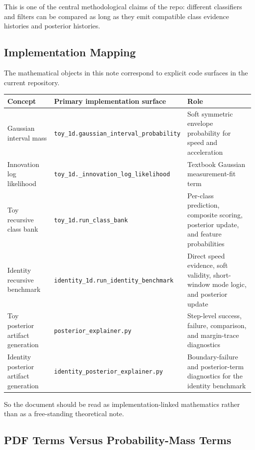\documentclass[11pt]{article}
\begin{document}
This is one of the central methodological claims of the repo: different
classifiers and filters can be compared as long as they emit compatible class
evidence histories and posterior histories.

\subsection{Implementation Mapping}

The mathematical objects in this note correspond to explicit code surfaces in
the current repository.

\begin{center}
\begin{tabular}{p{} p{} p{}}
\toprule
\textbf{Concept} & \textbf{Primary implementation surface} & \textbf{Role} \\
\midrule
Gaussian interval mass & \texttt{toy\_1d.gaussian\_interval\_probability} & Soft symmetric envelope probability for speed and acceleration \\
Innovation log likelihood & \texttt{toy\_1d.\_innovation\_log\_likelihood} & Textbook Gaussian measurement-fit term \\
Toy recursive class bank & \texttt{toy\_1d.run\_class\_bank} & Per-class prediction, composite scoring, posterior update, and feature probabilities \\
Identity recursive benchmark & \texttt{identity\_1d.run\_identity\_benchmark} & Direct speed evidence, soft validity, short-window mode logic, and posterior update \\
Toy posterior artifact generation & \texttt{posterior\_explainer.py} & Step-level success, failure, comparison, and margin-trace diagnostics \\
Identity posterior artifact generation & \texttt{identity\_posterior\_explainer.py} & Boundary-failure and posterior-term diagnostics for the identity benchmark \\
\bottomrule
\end{tabular}
\end{center}

So the document should be read as implementation-linked mathematics rather than
as a free-standing theoretical note.

\subsection{PDF Terms Versus Probability-Mass Terms}
\end{document}
